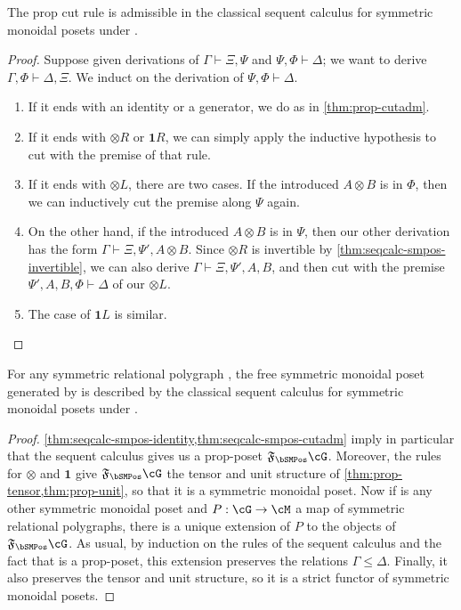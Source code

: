 \documentclass{book}
\let\types\vdash
\newcommand{\F}[1]{\mathfrak{F}_{#1}}
\def\one{\mathbf{1}}
\let\tensor\otimes
\def\tensorL{\mathord{\tensor}L}
\def\tensorR{\mathord{\tensor}R}
\begin{document}
\begin{thm}\label{thm:seqcalc-smpos-cutadm}
  The prop cut rule is admissible in the classical sequent calculus for symmetric monoidal posets under \cG.
\end{thm}
\begin{proof}
  Suppose given derivations of $\Gamma\types\Xi,\Psi$ and $\Psi,\Phi \types \Delta$; we want to derive $\Gamma,\Phi \types \Delta,\Xi$.
  We induct on the derivation of $\Psi,\Phi \types \Delta$.
  \begin{enumerate}
  \item If it ends with an identity or a generator, we do as in \cref{thm:prop-cutadm}.
  \item If it ends with $\tensorR$ or $\one R$, we can simply apply the inductive hypothesis to cut with the premise of that rule.
  \item If it ends with $\tensorL$, there are two cases.
    If the introduced $A\tensor B$ is in $\Phi$, then we can inductively cut the premise along $\Psi$ again.
  \item On the other hand, if the introduced $A\tensor B$ is in $\Psi$, then our other derivation has the form $\Gamma\types\Xi,\Psi',A\tensor B$.
    Since $\tensorR$ is invertible by \cref{thm:seqcalc-smpos-invertible}, we can also derive $\Gamma\types\Xi,\Psi',A,B$, and then cut with the premise $\Psi',A,B,\Phi \types \Delta$ of our $\tensorL$.
  \item The case of $\one L$ is similar.\qedhere
  \end{enumerate}
\end{proof}

\begin{thm}\label{thm:seqcalc-smpos-initial}
  For any symmetric relational polygraph \cG, the free symmetric monoidal poset generated by \cG is described by the classical sequent calculus for symmetric monoidal posets under \cG.
\end{thm}
\begin{proof}
  \cref{thm:seqcalc-smpos-identity,thm:seqcalc-smpos-cutadm} imply in particular that the sequent calculus gives us a prop-poset $\F\bSMPos\cG$.
  Moreover, the rules for $\tensor$ and $\one$ give $\F\bSMPos\cG$ the tensor and unit structure of \cref{thm:prop-tensor,thm:prop-unit}, so that it is a symmetric monoidal poset.
  Now if \cM is any other symmetric monoidal poset and $P:\cG\to\cM$ a map of symmetric relational polygraphs, there is a unique extension of $P$ to the objects of $\F\bSMPos\cG$.
  As usual, by induction on the rules of the sequent calculus and the fact that \cM is a prop-poset, this extension preserves the relations $\Gamma\le\Delta$.
  Finally, it also preserves the tensor and unit structure, so it is a strict functor of symmetric monoidal posets.
\end{proof}
\end{document}
